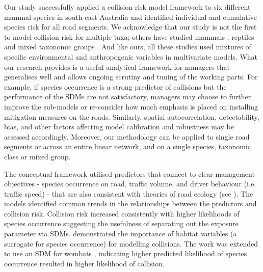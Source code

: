 Our study successfully applied a collision risk model framework to six different mammal species in south-east Australia and identified individual and cumulative species risk for all road segments. We acknowledge that our study is not the first to model collision risk for multiple taxa; others have studied mammals \citep{clev02,cser13,jaar06}, reptiles \citep{guns12,lang12} and mixed taxonomic groups \citep{clev02,garr15,lang09,litv08}.  And like ours, all these studies used mixtures of specific environmental and anthropogenic variables in multivariate models. What our research provides is a useful analytical framework for managers that generalises well and allows ongoing scrutiny and tuning of the working parts.  For example, if species occurrence is a strong predictor of collisions but the performance of the SDMs are not satisfactory, managers may choose to further improve the sub-models or re-consider how much emphasis is placed on installing mitigation measures on the roads.  Similarly, spatial autocorrelation, detectability, bias, and other factors affecting model calibration and robustness may be assessed accordingly. Moreover, our methodology can be applied to single road segments or across an entire linear network, and on a single species, taxonomic class or mixed group.

The conceptual framework utilised predictors that connect to clear management objectives - species occurrence on road, traffic volume, and driver behaviour (i.e. traffic speed) - that are also consistent with theories of road ecology (see \cite{form03}). The models identified common trends in the relationships between the predictors and collision risk. Collision risk increased consistently with higher likelihoods of species occurrence suggesting the usefulness of separating out the exposure parameter via SDMs. \cite{roge09} demonstrated the importance of habitat variables (a surrogate for species occurrence) for modelling collisions. The work was extended to use an SDM for wombats \citep{roge12}, indicating higher predicted likelihood of species occurrence resulted in higher likelihood of collision.

